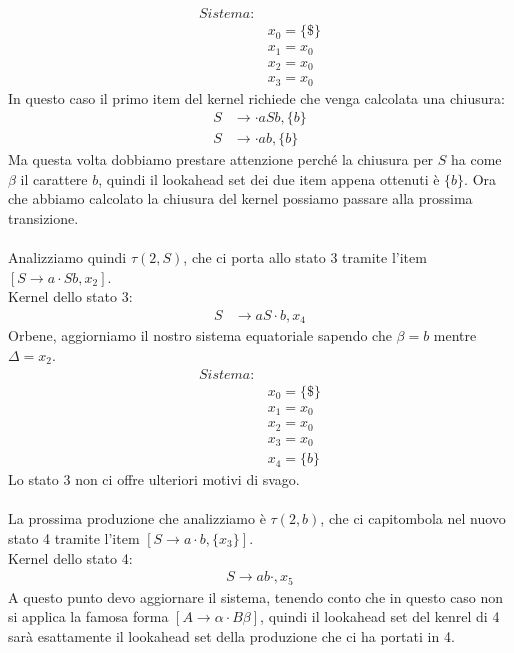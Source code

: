 \documentclass[class=book, crop=false, oneside, 12pt]{standalone}
\begin{document}
\begin{align*}
    Sistema:& \\
            & x_0 = \{\$\}\\
            & x_1 = x_0 \\
            & x_2 = x_0 \\
            & x_3 = x_0
\end{align*}
In questo caso il primo item del kernel richiede che venga calcolata una chiusura:
\begin{align*}
    S &\to  \cdot a S b, \{b\} \\
    S &\to  \cdot a b, \{b\}
\end{align*}
Ma questa volta dobbiamo prestare attenzione perché la chiusura per \(S\) ha come \(\beta\) il carattere \(b\), quindi il lookahead set dei due item appena  ottenuti è \(\{b\}\).
Ora che abbiamo calcolato la chiusura del kernel possiamo passare alla prossima transizione.
\\\\
Analizziamo quindi \(\tau(2,S)\), che ci porta allo stato 3 tramite l'item \([S \to a \cdot S b, x_2]\).
\\
Kernel dello stato 3:
\begin{align*}
    S &\to  a S \cdot b, x_4
\end{align*}
Orbene, aggiorniamo il nostro sistema equatoriale sapendo che \(\beta = b\) mentre \(\Delta = x_2\).
\begin{align*}
    Sistema:& \\
            & x_0 = \{\$\}\\
            & x_1 = x_0 \\
            & x_2 = x_0 \\
            & x_3 = x_0 \\
            & x_4 = \{b\}
\end{align*}
Lo stato 3 non ci offre ulteriori motivi di svago.
\\\\
La prossima produzione che analizziamo è  \(\tau(2,b)\), che ci capitombola nel nuovo stato 4 tramite l'item \([S \to a \cdot b, \{x_3\}]\).
\\
Kernel dello stato 4:
\begin{align*}
    S \to  a b \cdot, x_5
\end{align*}
A questo punto devo aggiornare il sistema, tenendo conto che in questo caso non si applica la famosa forma \([A \to \alpha \cdot B \beta]\), quindi il lookahead set del kenrel di 4 sarà esattamente il lookahead set della produzione che ci ha portati in 4.
\end{document}
